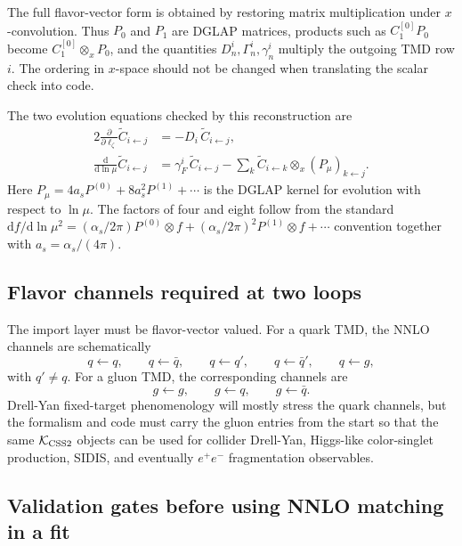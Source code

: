 \documentclass[11pt]{article}
\newcommand{\dd}{\mathrm{d}}
\newcommand{\ox}{\otimes_x}
\newcommand{\KCSS}{\mathcal K_{\rm CSS2}}
\begin{document}
The full flavor-vector form is obtained by restoring matrix multiplication under
$x$-convolution.  Thus $P_0$ and $P_1$ are DGLAP matrices, products such as
$C_1^{[0]}P_0$ become $C_1^{[0]}\ox P_0$, and the quantities
$D_n^i,\Gamma_n^i,\gamma_n^i$ multiply the outgoing TMD row $i$.  The ordering in
$x$-space should not be changed when translating the scalar check into code.

The two evolution equations checked by this reconstruction are
\begin{align}
  2\frac{\partial}{\partial \ell_\zeta}\widetilde C_{i\leftarrow j}
  &=-D_i\,\widetilde C_{i\leftarrow j},
  \label{eq:C-CS-reconstruct-check-v10}
  \\
  \frac{\dd}{\dd\ln\mu}\widetilde C_{i\leftarrow j}
  &=\gamma_F^i\,\widetilde C_{i\leftarrow j}
  -\sum_k \widetilde C_{i\leftarrow k}\ox (P_\mu)_{k\leftarrow j}.
  \label{eq:C-mu-reconstruct-check-v10}
\end{align}
Here $P_\mu=4a_sP^{(0)}+8a_s^2P^{(1)}+\cdots$ is the DGLAP kernel for evolution with respect to $\ln\mu$.  The factors of four and eight follow from the standard $\dd f/\dd\ln\mu^2=(\alpha_s/2\pi)P^{(0)}\otimes f+(\alpha_s/2\pi)^2P^{(1)}\otimes f+\cdots$ convention together with $a_s=\alpha_s/(4\pi)$.

\subsection{Flavor channels required at two loops}

The import layer must be flavor-vector valued.  For a quark TMD, the NNLO channels are
schematically
\begin{equation}
  q\leftarrow q,
  \qquad
  q\leftarrow \bar q,
  \qquad
  q\leftarrow q',
  \qquad
  q\leftarrow \bar q',
  \qquad
  q\leftarrow g,
  \label{eq:quark-C2-channels-v10}
\end{equation}
with $q'\ne q$.  For a gluon TMD, the corresponding channels are
\begin{equation}
  g\leftarrow g,
  \qquad
  g\leftarrow q,
  \qquad
  g\leftarrow \bar q.
  \label{eq:gluon-C2-channels-v10}
\end{equation}
Drell-Yan fixed-target phenomenology will mostly stress the quark channels, but the
formalism and code must carry the gluon entries from the start so that the same $\KCSS$
objects can be used for collider Drell-Yan, Higgs-like color-singlet production, SIDIS,
and eventually $e^+e^-$ fragmentation observables.

\subsection{Validation gates before using NNLO matching in a fit}
\end{document}
